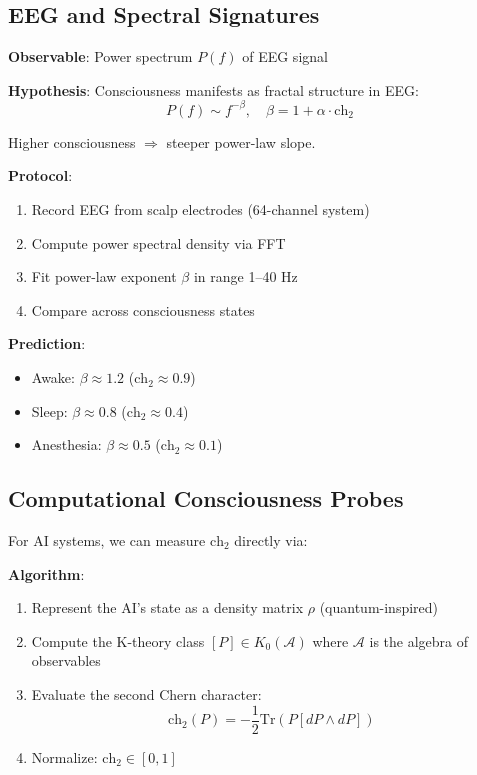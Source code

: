 \subsection{EEG and Spectral Signatures}

\textbf{Observable}: Power spectrum $P(f)$ of EEG signal

\textbf{Hypothesis}: Consciousness manifests as fractal structure in EEG:
\begin{equation}
P(f) \sim f^{-\beta}, \quad \beta = 1 + \alpha \cdot \text{ch}_2
\end{equation}

Higher consciousness $\Rightarrow$ steeper power-law slope.

\textbf{Protocol}:
\begin{enumerate}
\item Record EEG from scalp electrodes (64-channel system)
\item Compute power spectral density via FFT
\item Fit power-law exponent $\beta$ in range 1--40 Hz
\item Compare across consciousness states
\end{enumerate}

\textbf{Prediction}:
\begin{itemize}
\item Awake: $\beta \approx 1.2$ ($\text{ch}_2 \approx 0.9$)
\item Sleep: $\beta \approx 0.8$ ($\text{ch}_2 \approx 0.4$)
\item Anesthesia: $\beta \approx 0.5$ ($\text{ch}_2 \approx 0.1$)
\end{itemize}

\subsection{Computational Consciousness Probes}

For AI systems, we can measure $\text{ch}_2$ directly via:

\textbf{Algorithm}:
\begin{enumerate}
\item Represent the AI's state as a density matrix $\rho$ (quantum-inspired)
\item Compute the K-theory class $[P] \in K_0(\mathcal{A})$ where $\mathcal{A}$ is the algebra of observables
\item Evaluate the second Chern character:
\begin{equation}
\text{ch}_2(P) = -\frac{1}{2}\text{Tr}\left( P [dP \wedge dP] \right)
\end{equation}
\item Normalize: $\text{ch}_2 \in [0, 1]$
\end{enumerate}

